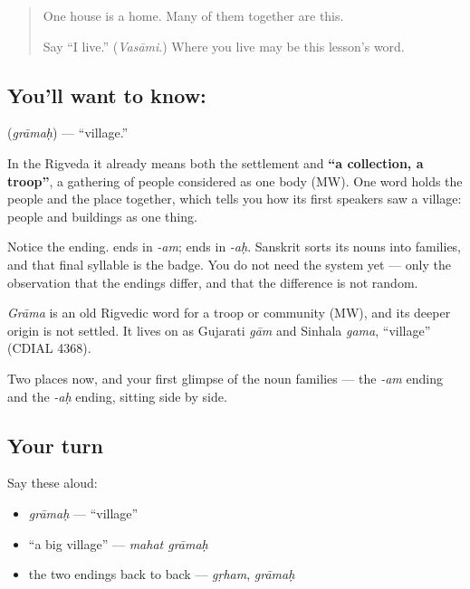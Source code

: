 \begin{quote}
One house is a home. Many of them together are this.

Say \textquotedblleft{}I live.\textquotedblright{} (\emph{Vasāmi}.) Where you live may be this lesson's word.
\end{quote}

\subsection*{You'll want to know: }
\textbf{} (\emph{grāmaḥ}) — \textquotedblleft{}village.\textquotedblright{}

In the Rigveda it already means both the settlement and \textbf{\textquotedblleft{}a collection, a troop\textquotedblright{}}, a gathering of people considered as one body (MW). One word holds the people and the place together, which tells you how its first speakers saw a village: people and buildings as one thing.

Notice the ending.  ends in \emph{-am};  ends in \emph{-aḥ}. Sanskrit sorts its nouns into families, and that final syllable is the badge. You do not need the system yet — only the observation that the endings differ, and that the difference is not random.

\begin{cousinweb}
\emph{Grāma} is an old Rigvedic word for a troop or community (MW), and its deeper origin is not settled. It lives on as Gujarati \emph{gām} and Sinhala \emph{gama}, \textquotedblleft{}village\textquotedblright{} (CDIAL 4368).
\end{cousinweb}

\begin{grammarlens}[title={What you've built}]
Two places now, and your first glimpse of the noun families — the \emph{-am} ending and the \emph{-aḥ} ending, sitting side by side.
\end{grammarlens}

\subsection*{Your turn}
Say these aloud:

\begin{itemize}
\raggedright
  \item \emph{grāmaḥ} — \textquotedblleft{}village\textquotedblright{}
  \item \textquotedblleft{}a big village\textquotedblright{} — \emph{mahat grāmaḥ}
  \item the two endings back to back — \emph{gṛham}, \emph{grāmaḥ}
\end{itemize}

